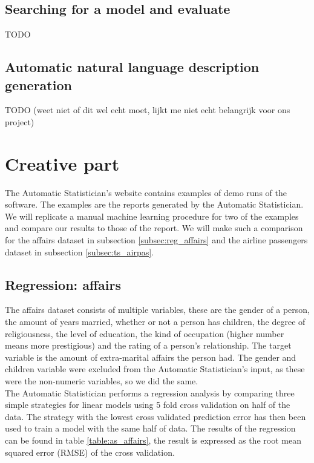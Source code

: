 \documentclass[a4paper, 10pt, conference]{ieeeconf}
\begin{document}
\subsection{Searching for a model and evaluate}
TODO

\subsection{Automatic natural language description generation}
TODO (weet niet of dit wel echt moet, lijkt me niet echt belangrijk voor ons project)

\section{Creative part}
The Automatic Statistician's website  contains examples of demo runs of the software. The examples are the reports generated by the Automatic Statistician. We will replicate a manual machine learning procedure for two of the examples and compare our results to those of the report. We will make such a comparison for the affairs dataset  in subsection \ref{subsec:reg_affairs} and the airline passengers dataset  in subsection \ref{subsec:ts_airpas}.

\subsection{Regression: affairs}
The affairs dataset consists of multiple variables, these are the gender of a person, the amount of years married, whether or not a person has children, the degree of religiousness, the level of education, the kind of occupation (higher number means more prestigious) and the rating of a person's relationship. The target variable is the amount of extra-marital affairs the person had. The gender and children variable were excluded from the Automatic Statistician's input, as these were the non-numeric variables, so we did the same.\\

The Automatic Statistician performs a regression analysis by comparing three simple strategies for linear models using 5 fold cross validation on half of the data. The strategy with the lowest cross validated prediction error has then been used to train a model with the same half of data. The results of the regression can be found in table \ref{table:as_affairs}, the result is expressed as the root mean squared error (RMSE) of the cross validation.
\end{document}

